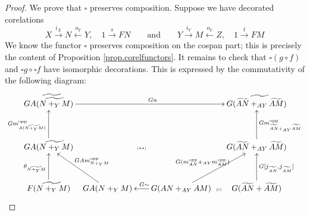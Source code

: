 \begin{proof}
  We prove that $\square$ preserves composition. Suppose we have decorated corelations
  \[
    X \stackrel{i_X}{\longrightarrow} N \stackrel{o_Y}{\longleftarrow} Y, \quad
    1 \stackrel{s}{\to} FN
    \qquad
    \mbox{and}
    \qquad 
    Y \stackrel{i_Y}{\longrightarrow} M \stackrel{o_Y}{\longleftarrow} Z, \quad
    1 \stackrel{t}{\to} FM
  \]
  We know the functor $\square$ preserves composition on the cospan part; this
  is precisely the content of Proposition \ref{prop.corelfunctors}. It remains to
  check that $\square( g \circ f)$ and $\square g \circ \square f$ have
  isomorphic decorations. This is expressed by the commutativity of the
  following diagram:
  \[
    \xymatrixrowsep{1.1pc}
    \xymatrixcolsep{0pc}
    \xymatrix{
      G\widetilde{A(\widetilde{N+_YM})} \ar[rrrrrr]^{Gn} &&&&&&
      G\widetilde{(\widetilde{AN}+_{AY}\widetilde{AM})}\\
      \\
      GA(\widetilde{N+_YM}) \ar[uu]^{Gm^\opp_{A(\widetilde{N+_YM})}} &&&
      \textsc{\tiny($\ast\ast$)} &&& 
      G(\widetilde{AN}+_{AY}\widetilde{AM}) \ar[uu]_{Gm^\opp_{\widetilde{AN}+_{AY}\widetilde{AM}}} \\
      \\
      F(\widetilde{N+_YM}) \ar[uu]^{\theta_{\widetilde{N+_YM}}} & %
      &
      GA(N+_YM) \ar[uull]_{GAm^\opp_{N+_YM}} && 
      G(AN+_{AY}AM) \ar[ll]_{G\sim} \ar[uurr]^{G(m_{AN}^\opp +_{AY}m_{AM}^\opp)}
      & \textsc{\tiny(c)} & 
      G(\widetilde{AN}+\widetilde{AM}) \ar[uu]_{G[j_{\widetilde{AN}},j_{\widetilde{AM}}]} 
}\]
\end{proof}
